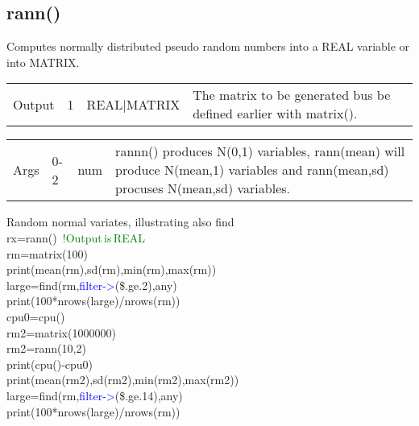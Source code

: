 \subsection{rann()}
\label{rann}
Computes normally distributed pseudo random numbers into a REAL variable or
into MATRIX.
\begin{table}[H]
\begin{tabular}{ m{}  m{}m{}p{}}
Output&1&REAL|MATRIX&The matrix to be generated bus be defined earlier with \textcolor{VioletRed}{matrix}().
\\ \cline{1-4}
\end{tabular}
\end{table}
\vspace{-1.51em}
\begin{table}[H]
\begin{tabular}{ m{}  m{}m{}p{}}
Args&0-2&num& rannn() produces N(0,1) variables, \textcolor{VioletRed}{rann}(mean) will produce
N(mean,1) variables and \textcolor{VioletRed}{rann}(mean,sd) procuses N(mean,sd) variables.
\\ \cline{1-4}
\end{tabular}
\end{table}
\begin{example}[rannex]Random normal variates, illustrating also find\\
\label{rannex}
rx=\textcolor{VioletRed}{rann}() \,\textcolor{green}{!Output\,is\,REAL}\\
rm=\textcolor{VioletRed}{matrix}(100)\\
\textcolor{VioletRed}{print}(\textcolor{VioletRed}{mean}(rm),\textcolor{VioletRed}{sd}(rm),\textcolor{VioletRed}{min}(rm),\textcolor{VioletRed}{max}(rm))\\
large=\textcolor{VioletRed}{find}(rm,\textcolor{blue}{filter->}(\$.ge.2),any)\\
\textcolor{VioletRed}{print}(100*nrows(large)/\textcolor{VioletRed}{nrows}(rm))\\
cpu0=\textcolor{VioletRed}{cpu}()\\
rm2=\textcolor{VioletRed}{matrix}(1000000)\\
rm2=\textcolor{VioletRed}{rann}(10,2)\\
\textcolor{VioletRed}{print}(\textcolor{VioletRed}{cpu}()-cpu0)\\
\textcolor{VioletRed}{print}(\textcolor{VioletRed}{mean}(rm2),\textcolor{VioletRed}{sd}(rm2),\textcolor{VioletRed}{min}(rm2),\textcolor{VioletRed}{max}(rm2))\\
large=\textcolor{VioletRed}{find}(rm,\textcolor{blue}{filter->}(\$.ge.14),any)\\
\textcolor{VioletRed}{print}(100*nrows(large)/\textcolor{VioletRed}{nrows}(rm))
\end{example}
